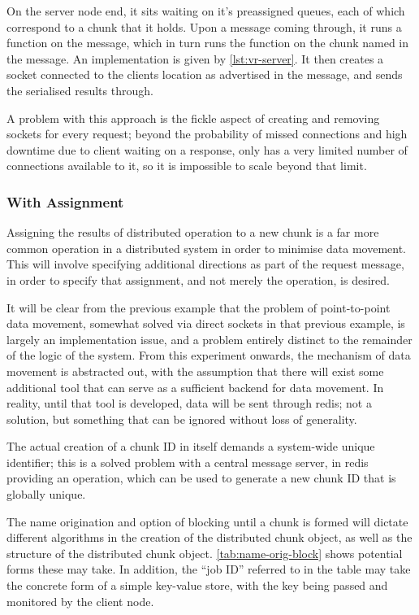 On the server node end, it sits waiting on it's preassigned queues, each of
which correspond to a chunk that it holds. 
Upon a message coming through, it runs a  function on the
message, which in turn runs the function on the chunk named in the message. 
An implementation is given by \cref{lst:vr-server}.
It then creates a socket connected to the clients location as advertised in
the message, and sends the serialised results through.

A problem with this approach is the fickle aspect of creating and removing
sockets for every request; beyond the probability of missed connections and
high downtime due to client waiting on a response, \R{} only has a very limited
number of connections available to it, so it is impossible to scale beyond that
limit.

\subsubsection{With Assignment}

Assigning the results of distributed operation to a new chunk is a far more
common operation in a distributed system in order to minimise data movement.
This will involve specifying additional directions as part of the request
message, in order to specify that assignment, and not merely the operation, is
desired.

It will be clear from the previous example that the problem of point-to-point
data movement, somewhat solved via direct sockets in that previous example, is
largely an implementation issue, and a problem entirely distinct to the
remainder of the logic of the system.
From this experiment onwards, the mechanism of data movement is abstracted out,
with the assumption that there will exist some additional tool that can serve
as a sufficient backend for data movement.
In reality, until that tool is developed, data will be sent through redis; not
a solution, but something that can be ignored without loss of generality.

The actual creation of a chunk ID in itself demands a system-wide unique
identifier; this is a solved problem with a central message server, in redis
providing an  operation, which can be used to generate a new chunk
ID that is globally unique.

The name origination and option of blocking until a chunk is formed will
dictate different algorithms in the creation of the distributed chunk object,
as well as the structure of the distributed chunk object.
\cref{tab:name-orig-block} shows potential forms these may take.
In addition, the ``job ID'' referred to in the table may
take the concrete form of a simple key-value store, with the key being passed
and monitored by the client node.

